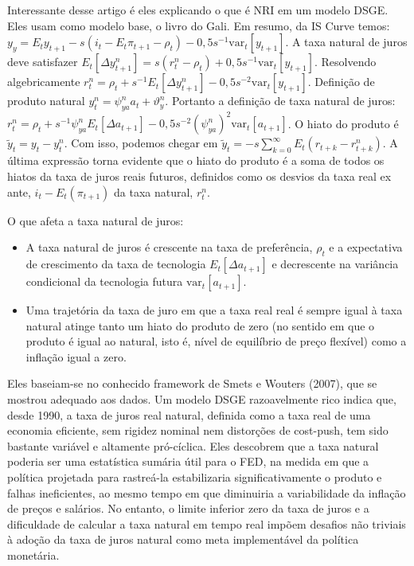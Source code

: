 Interessante desse artigo é eles explicando o que é NRI em um modelo DSGE. Eles usam como modelo base, o livro do Gali. Em resumo, da IS Curve temos: $y_y = E_t y_{t+1} - s(i_t - E_t \pi_{t+1} - \rho_t ) - 0,5 s^{-1}\text{var}_t[y_{t+1}] $. A taxa natural de juros deve satisfazer $E_t[\Delta y_{t+1}^{n}] = s(r_t^{n} - \rho_t) + 0,5s^{-1}\text{var}_t[y_{t+1}] $. Resolvendo algebricamente $r_t^{n} = \rho_t + s^{-1}E_t[\Delta y_{t+1}^{n}] - 0,5s^{-2}\text{var}_t[y_{t+1}]$. Definição de produto natural $y_t^{n} = \psi_{ya}^{n}a_t + \vartheta_y^{n} $. Portanto a definição de taxa natural de juros: $r_t^{n} = \rho_t + s^{-1}\psi_{ya}^{n} E_t[\Delta a_{t+1}] - 0,5s^{-2}(\psi_{ya}^{n})^{2}\text{var}_t[a_{t+1}]$. O hiato do produto é $\tilde{y}_t = y_t - y_t^{n} $. Com isso, podemos chegar em $\tilde{y}_t = -s \sum_{k=0}^{\infty} E_t(r_{t+k} - r_{t+k}^{n}) $. A última expressão torna evidente que o hiato do produto é a soma de todos os hiatos da taxa de juros reais futuros, definidos como os desvios da taxa real ex ante, $i_t - E_t(\pi_{t+1})$ da taxa natural, $r_{t}^{n} $.

O que afeta a taxa natural de juros:
\begin{itemize}
    \item A taxa natural de juros é crescente na taxa de preferência, $\rho_t$ e a expectativa de crescimento da taxa de tecnologia $E_t[\Delta a_{t+1}] $ e decrescente na variância condicional da tecnologia futura $\text{var}_t[a_{t+1}] $.
    \item Uma trajetória da taxa de juro em que a taxa real real é sempre igual à taxa natural atinge tanto um hiato do produto de zero (no sentido em que o produto é igual ao natural, isto é, nível de equilíbrio de preço flexível) como a inflação igual a zero.
\end{itemize}

Eles baseiam-se no conhecido framework de Smets e Wouters (2007), que se mostrou adequado aos dados. Um modelo DSGE razoavelmente rico indica que, desde 1990, a taxa de juros real natural, definida como a taxa real de uma economia eficiente, sem rigidez nominal nem distorções de cost-push, tem sido bastante variável e altamente pró-cíclica. Eles descobrem que a taxa natural poderia ser uma estatística sumária útil para o FED, na medida em que a política projetada para rastreá-la estabilizaria significativamente o produto e falhas ineficientes, ao mesmo tempo em que diminuiria a variabilidade da inflação de preços e salários. No entanto, o limite inferior zero da taxa de juros e a dificuldade de calcular a taxa natural em tempo real impõem desafios não triviais à adoção da taxa de juros natural como meta implementável da política monetária.

